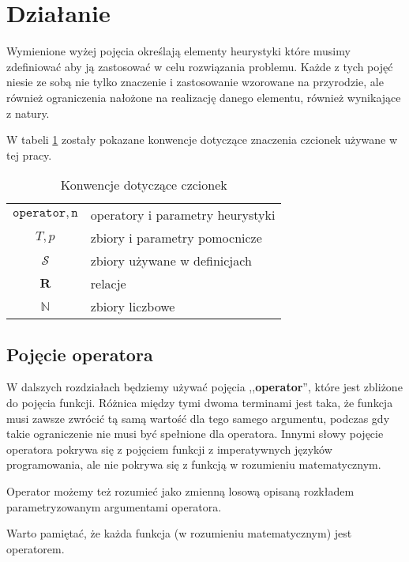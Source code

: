 \documentclass[twoside]{iisthesis}
\newcommand{\numberSet}{\mathbb}
\newcommand{\important}{\mathcal}
\newcommand{\R}{\mathbf{R}}
\newcommand{\param}{\mathtt}
\begin{document}
\section{Działanie}

Wymienione wyżej pojęcia określają elementy heurystyki które musimy zdefiniować aby ją zastosować w celu rozwiązania problemu. Każde z tych pojęć niesie ze sobą nie tylko znaczenie i zastosowanie wzorowane na przyrodzie, ale również ograniczenia nałożone na realizację danego elementu, również wynikające z natury.

W tabeli \ref{table_signature_conventions} zostały pokazane konwencje dotyczące znaczenia czcionek używane w tej pracy.


\begin{table}
	\caption{Konwencje dotyczące czcionek \label{table_signature_conventions}}
	\centering
	\begin{tabular}{cl}
		$\param{operator}, \param{n}$ & operatory i parametry heurystyki \\
		$T, p$ & zbiory i parametry pomocnicze \\
		$\important{S}$ & zbiory używane w definicjach \\
		$\R$ & relacje \\
		$\numberSet{N}$ & zbiory liczbowe
	\end{tabular}
\end{table}

\subsection{Pojęcie operatora} \label{subsection_operator}

W dalszych rozdziałach będziemy używać pojęcia ,,\textbf{operator}'', które jest zbliżone do pojęcia funkcji. Różnica między tymi dwoma terminami jest taka, że funkcja musi zawsze zwrócić tą samą wartość dla tego samego argumentu, podczas gdy takie ograniczenie nie musi być spełnione dla operatora. Innymi słowy pojęcie operatora pokrywa się z pojęciem funkcji z imperatywnych języków programowania, ale nie pokrywa się z funkcją w rozumieniu matematycznym.

Operator możemy też rozumieć jako zmienną losową opisaną rozkładem parametryzowanym argumentami operatora.

Warto pamiętać, że każda funkcja (w rozumieniu matematycznym) jest operatorem.
\end{document}
